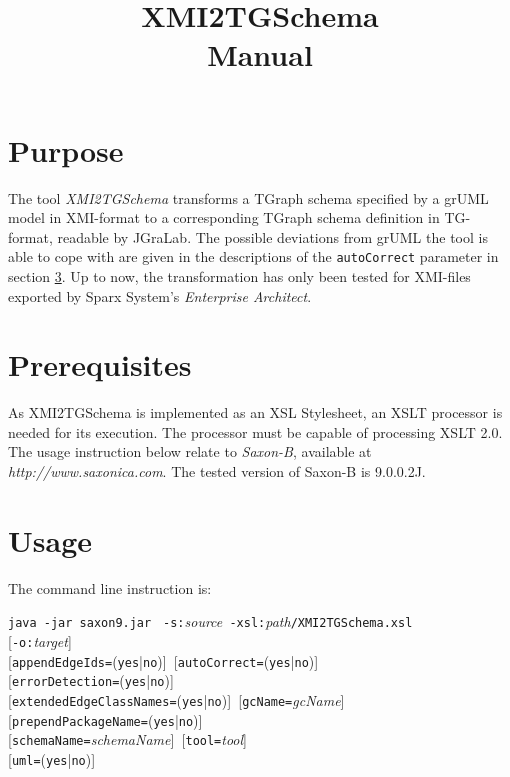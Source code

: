 \documentclass[a4paper]{article}
\title{\LARGE XMI2TGSchema\\Manual}
\begin{document}
	\maketitle
	\vspace{-6pt}
	
	\section{Purpose}
	The tool \emph{XMI2TGSchema} transforms a TGraph schema specified by a grUML model in XMI-format to a corresponding TGraph schema definition in TG-format, readable by JGraLab. The possible deviations from grUML the tool is able to cope with are given in the descriptions of the \texttt{autoCorrect} parameter in section \ref{sec:Usage}. Up to now, the transformation has only been tested for XMI-files exported by Sparx System's \emph{Enterprise Architect}.
	
	\section{Prerequisites}
	As XMI2TGSchema is implemented as an XSL Stylesheet, an XSLT processor is needed for its execution. The processor must be capable of processing XSLT 2.0. The usage instruction below relate to \emph{Saxon-B}, available at \emph{http://www.saxonica.com}. The tested version of Saxon-B is 9.0.0.2J.
	
	\section{Usage} \label{sec:Usage}
	The command line instruction is:
	
	\texttt{java -jar saxon9.jar } \texttt{-s:}\emph{source}\texttt{ -xsl:}\emph{path}\texttt{/XMI2TGSchema.xsl} \\
	\mbox{[}\texttt{-o:}\emph{target}] \\
	\mbox{[}\texttt{appendEdgeIds=}(\texttt{yes}|\texttt{no})]\texttt{ }[\texttt{autoCorrect=}(\texttt{yes}|\texttt{no})] \\
	\mbox{[}\texttt{errorDetection=}(\texttt{yes}|\texttt{no})] \\
	\mbox{[}\texttt{extendedEdgeClassNames=}(\texttt{yes}|\texttt{no})]\texttt{ }[\texttt{gcName=}\emph{gcName}] \\
	\mbox{[}\texttt{prependPackageName=}(\texttt{yes}|\texttt{no})] \\
	\mbox{[}\texttt{schemaName=}\emph{schemaName}]\texttt{ }[\texttt{tool=}\emph{tool}] \\
	\mbox{[}\texttt{uml=}(\texttt{yes}|\texttt{no})] \\
	
\end{document}
